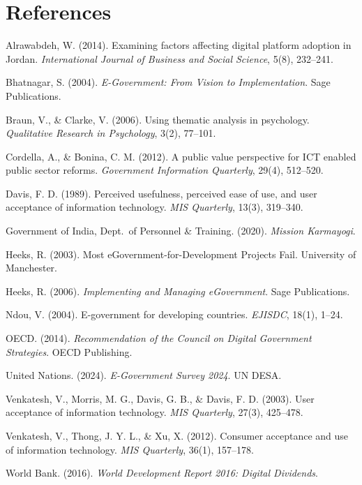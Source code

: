 \documentclass[11pt,a4paper]{article}
\begin{document}
\section*{References}
\begin{enumerate}[leftmargin=1.5em,itemsep=3pt,label={[\arabic*]}]
\item Alrawabdeh, W. (2014). Examining factors affecting digital platform adoption in Jordan. \textit{International Journal of Business and Social Science}, 5(8), 232--241.
\item Bhatnagar, S. (2004). \textit{E-Government: From Vision to Implementation}. Sage Publications.
\item Braun, V., \& Clarke, V. (2006). Using thematic analysis in psychology. \textit{Qualitative Research in Psychology}, 3(2), 77--101.
\item Cordella, A., \& Bonina, C. M. (2012). A public value perspective for ICT enabled public sector reforms. \textit{Government Information Quarterly}, 29(4), 512--520.
\item Davis, F. D. (1989). Perceived usefulness, perceived ease of use, and user acceptance of information technology. \textit{MIS Quarterly}, 13(3), 319--340.
\item Government of India, Dept.\ of Personnel \& Training. (2020). \textit{Mission Karmayogi}.
\item Heeks, R. (2003). Most eGovernment-for-Development Projects Fail. University of Manchester.
\item Heeks, R. (2006). \textit{Implementing and Managing eGovernment}. Sage Publications.
\item Ndou, V. (2004). E-government for developing countries. \textit{EJISDC}, 18(1), 1--24.
\item OECD. (2014). \textit{Recommendation of the Council on Digital Government Strategies}. OECD Publishing.
\item United Nations. (2024). \textit{E-Government Survey 2024}. UN DESA.
\item Venkatesh, V., Morris, M. G., Davis, G. B., \& Davis, F. D. (2003). User acceptance of information technology. \textit{MIS Quarterly}, 27(3), 425--478.
\item Venkatesh, V., Thong, J. Y. L., \& Xu, X. (2012). Consumer acceptance and use of information technology. \textit{MIS Quarterly}, 36(1), 157--178.
\item World Bank. (2016). \textit{World Development Report 2016: Digital Dividends}.
\end{enumerate}
\end{document}

